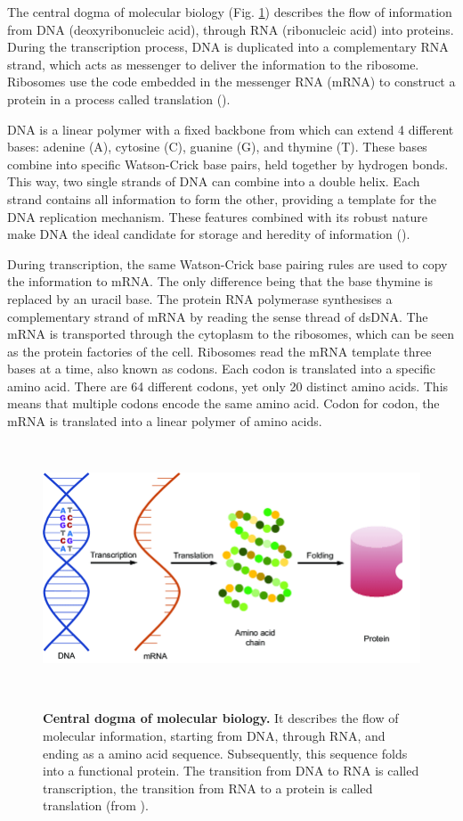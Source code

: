 The central dogma of molecular biology (Fig. \ref{fig:central_dogma}) describes the flow of information from DNA (deoxyribonucleic acid), 
through RNA (ribonucleic acid) into proteins. 
During the transcription process,
DNA is duplicated into a complementary RNA strand, 
which acts as messenger to deliver the information to the ribosome. 
Ribosomes use the code embedded in the messenger RNA (mRNA) to construct 
a protein in a process called translation (\cite{crick1970}).

DNA is a linear polymer with a fixed backbone from which can extend 4 different bases: 
adenine (A),
cytosine (C), 
guanine (G),
and thymine (T). 
These bases combine into specific Watson-Crick base pairs,
held together by hydrogen bonds. 
This way, two single strands of DNA can combine into a double helix.
Each strand contains all information to form the other, 
providing a template for the DNA replication mechanism. 
These features combined with its robust nature make DNA the ideal candidate for storage
and heredity of information (\cite{berg2015}).

During transcription, 
the same Watson-Crick base pairing rules are used to copy the information to mRNA. 
The only difference being that the base thymine is replaced by an uracil base. 
The protein RNA polymerase synthesises a complementary strand of mRNA by reading the sense thread of dsDNA. 
The mRNA is transported through the cytoplasm to the ribosomes, 
which can be seen as the protein factories of the cell. 
Ribosomes read the mRNA template three bases at a time, also known as codons. 
Each codon is translated into a specific amino acid.
There are 64 different codons, yet only 20 distinct amino acids. 
This means that multiple codons encode the same amino acid. 
Codon for codon, the mRNA is translated into a linear polymer of amino acids.

~\begin{figure}[h!]
	\includegraphics[width=\linewidth]{./literature_review/central_dogma/img/central_dogma.png}
	\caption{
	\textbf{Central dogma of molecular biology.}
	It describes the flow of molecular information, 
	starting from DNA, 
	through RNA, 
	and ending as a amino acid sequence. 
	Subsequently, this sequence folds into a functional protein.
	The transition from DNA to RNA is called transcription, 
	the transition from RNA to a protein is called translation
	(from \cite{cichonska2018}).	
	}
	\label{fig:central_dogma}
~\end{figure}
